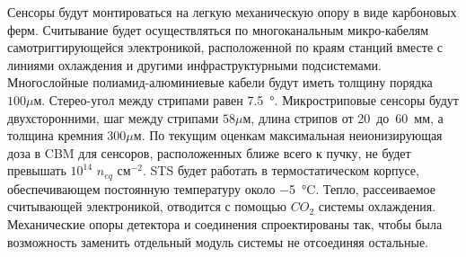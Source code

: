 Сенсоры будут монтироваться на легкую механическую опору в виде карбоновых ферм. Считывание будет осуществляться по многоканальным микро-кабелям самотриггирующейся электроникой, расположенной по краям станций вместе с линиями охлаждения и другими инфраструктурными подсистемами.
Многослойные полиамид-алюминиевые кабели будут иметь толщину порядка $100 \mu$м.
Стерео-угол между стрипами равен \SI{7.5}{\degree}.
Микростриповые сенсоры будут двухсторонними, шаг между стрипами $58 \mu$м, длина стрипов от 20~до~60~мм, а толщина кремния $300 \mu$м. По текущим оценкам максимальная неионизирующая доза в CBM для сенсоров, расположенных ближе всего к пучку, не будет превышать $10^{14}$ $n_{eq}$ см$^{-2}$. STS будет работать в термостатическом корпусе, обеспечивающем постоянную температуру около \SI{-5}{\degreeCelsius}. Тепло, рассеиваемое считывающей электроникой, отводится с помощью $CO_{2}$ системы охлаждения. Механические опоры детектора и соединения спроектированы так, чтобы была возможность заменить отдельный модуль системы не отсоединяя остальные.


